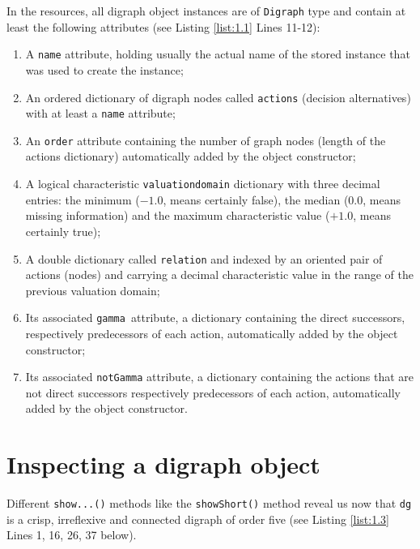 In the \Digraph resources, all digraph object instances are of \texttt{Digraph} type and contain at least the following attributes (see Listing \ref{list:1.1}  Lines 11-12):
\begin{enumerate}[leftmargin=0.5cm,listparindent=0em,nosep]
\item A \texttt{name} attribute, holding usually the actual name of the stored instance that was used to create the instance;
\item An ordered dictionary of digraph nodes called \texttt{actions} (decision alternatives) with at least a \texttt{name} attribute;
\item An \texttt{order} attribute containing the number of graph nodes (length of the actions dictionary) automatically added by the object constructor;
\item  A logical characteristic \texttt{valuationdomain} dictionary with three decimal entries: the minimum ($-1.0$, means certainly false), the median ($0.0$, means missing information) and the maximum characteristic value ($+1.0$, means certainly true);
\item A double dictionary called \texttt{relation} and indexed by an oriented pair of actions (nodes) and carrying a decimal characteristic value in the range of the previous valuation domain;
\item Its associated \texttt{gamma }attribute, a dictionary containing the direct successors, respectively predecessors of each action, automatically added by the object constructor;
\item Its associated \texttt{notGamma} attribute, a dictionary containing the actions that are not direct successors respectively predecessors of each action, automatically added by the object constructor.
\end{enumerate}

\section{Inspecting a digraph object}
\label{sec:1.4}

Different \texttt{show...()} methods like the \texttt{showShort()} method  reveal us now that \texttt{dg} is a crisp, irreflexive and connected digraph of order five (see Listing \ref{list:1.3}  Lines 1, 16, 26, 37 below).

